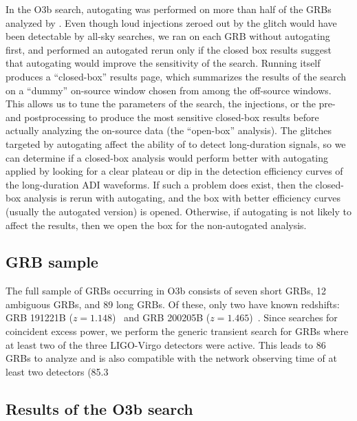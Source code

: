 In the O3b search, autogating was performed on more than half of the \acp{GRB} analyzed by \xpip.
Even though loud injections zeroed out by the glitch would have been detectable by all-sky searches, we ran \xpip on each \ac{GRB} without autogating first, and performed an autogated rerun only if the closed box results suggest that autogating would improve the sensitivity of the search.
Running \xpip itself produces a ``closed-box'' results page, which summarizes the results of the search on a ``dummy'' on-source window chosen from among the off-source windows.
This allows us to tune the parameters of the search, the injections, or the pre- and postprocessing to produce the most sensitive closed-box results before actually analyzing the on-source data (the ``open-box'' analysis).
The glitches targeted by autogating affect the ability of \xpip to detect long-duration signals, so we can determine if a closed-box analysis would perform better with autogating applied by looking for a clear plateau or dip in the detection efficiency curves of the long-duration \ac{ADI} waveforms.
If such a problem does exist, then the closed-box analysis is rerun with autogating, and the box with better efficiency curves (usually the autogated version) is opened.
Otherwise, if autogating is not likely to affect the results, then we open the box for the non-autogated analysis.


\subsection{GRB sample}\label{sec:grb-o3b-sample}

The full sample of \acp{GRB} occurring in O3b consists of seven short \acp{GRB}, 12 ambiguous \acp{GRB}, and 89 long \acp{GRB}.
Of these, only two have known redshifts: GRB 191221B ($z = 1.148$)~\citep{Kuin_2019, Vielfaure_2019} and GRB 200205B ($z = 1.465$)~\citep{Vielfaure_2020}.
Since \xpip searches for coincident excess power, we perform the generic transient search for \acp{GRB} where at least two of the three LIGO-Virgo detectors were active.
This leads to 86 GRBs to analyze and is also compatible with the network observing time of at least two detectors (85.3%

\subsection{Results of the O3b search}\label{sec:grb-o3b-results}

